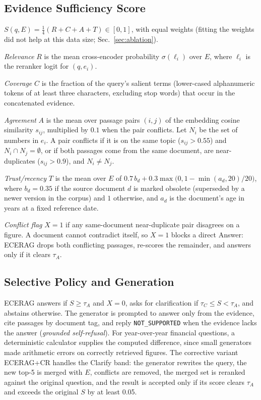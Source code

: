 \documentclass[conference,letterpaper]{IEEEtran}
\newcommand{\tA}{\tau_A}
\newcommand{\tC}{\tau_C}
\begin{document}
\subsection{Evidence Sufficiency Score}
$S(q,E)=\tfrac14(R+C+A+T)\in[0,1]$, with equal weights (fitting the weights did not help at this
data size; Sec.~\ref{sec:ablation}).

\emph{Relevance} $R$ is the mean cross-encoder probability $\sigma(\ell_i)$ over $E$, where
$\ell_i$ is the reranker logit for $(q,e_i)$.

\emph{Coverage} $C$ is the fraction of the query's salient terms (lower-cased alphanumeric tokens
of at least three characters, excluding stop words) that occur in the concatenated evidence.

\emph{Agreement} $A$ is the mean over passage pairs $(i,j)$ of the embedding cosine similarity
$s_{ij}$, multiplied by $0.1$ when the pair conflicts. Let $N_i$ be the set of numbers in $e_i$.
A pair conflicts if it is on the same topic ($s_{ij}>0.55$) and $N_i\cap N_j=\emptyset$, or if both
passages come from the same document, are near-duplicates ($s_{ij}>0.9$), and $N_i\neq N_j$.

\emph{Trust/recency} $T$ is the mean over $E$ of $0.7\,b_d+0.3\max\!\bigl(0,1-\min(a_d,20)/20\bigr)$,
where $b_d=0.35$ if the source document $d$ is marked obsolete (superseded by a newer version in
the corpus) and $1$ otherwise, and $a_d$ is the document's age in years at a fixed reference date.

\emph{Conflict flag} $X=1$ if any same-document near-duplicate pair disagrees on a figure. A
document cannot contradict itself, so $X=1$ blocks a direct Answer: ECERAG drops both conflicting
passages, re-scores the remainder, and answers only if it clears $\tA$.

\subsection{Selective Policy and Generation}
ECERAG answers if $S\ge\tA$ and $X=0$, asks for clarification if $\tC\le S<\tA$, and abstains
otherwise. The generator is prompted to answer only from the evidence, cite passages by document
tag, and reply \texttt{NOT\_SUPPORTED} when the evidence lacks the answer (\emph{grounded
self-refusal}). For year-over-year financial questions, a deterministic calculator supplies the
computed difference, since small generators made arithmetic errors on correctly retrieved
figures. The corrective variant ECERAG+CR handles the Clarify band: the generator rewrites the
query, the new top-5 is merged with $E$, conflicts are removed, the merged set is reranked
against the original question, and the result is accepted only if its score clears $\tA$ and
exceeds the original $S$ by at least 0.05.
\end{document}
